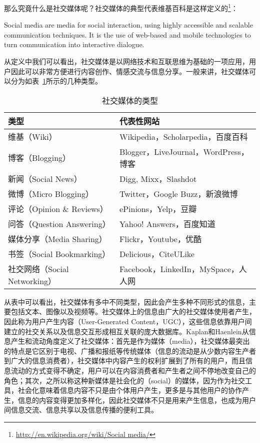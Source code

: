 那么究竟什么是社交媒体呢？社交媒体的典型代表维基百科是这样定义的\footnote{\url{http://en.wikipedia.org/wiki/Social media/}}：

\begin{definition}
Social media are media for social interaction, using highly accessible and scalable communication techniques. It is the use of web-based and mobile technologies to turn communication into interactive dialogue.
\end{definition}

从定义中我们可以看出，社交媒体是以网络技术和互联思维为基础的一项应用，用户因此可以非常方便进行内容创作、情感交流与信息分享。一般来讲，社交媒体可以分为如表~\ref{tab1-2}所示的几种类型。

\begin{table}[htp]
\centering
\caption{社交媒体的类型}
\label{tab1-2}
 \begin{tabular}{|l|l|}
 \hline
 类型& 代表性网站\\
 \hline
 维基（Wiki） & Wikipedia，Scholarpedia，百度百科\\
 \hline
 博客（Blogging） & Blogger，LiveJournal，WordPress，博客\\
 \hline
 新闻（Social News） & Digg, Mixx，Slashdot\\
 \hline
 微博（Micro Blogging） & Twitter，Google Buzz，新浪微博\\
 \hline
 评论（Opinion \& Reviews） & ePinions，Yelp，豆瓣\\
 \hline
 问答（Question Answering） & Yahoo! Answers，百度知道\\
 \hline
 媒体分享（Media Sharing） & Flickr，Youtube，优酷\\
 \hline
 书签（Social Bookmarking） & Delicious，CiteULike\\
 \hline
 社交网络（Social Networking） & Facebook，LinkedIn，MySpace，人人网\\
 \hline
\end{tabular}
\end{table}

从表中可以看出，社交媒体有多中不同类型，因此会产生多种不同形式的信息，主要包括文本、图像以及视频等。社交媒体上的信息由广大的社交媒体使用者产生，因此称为用户产生内容（User-Generated Content，UGC），这些信息依靠用户间建立的社交关系以及信息交互形成相互关联的庞大数据库。Kaplan和Haenlein从信息产生和流动角度定义了社交媒体：首先是作为媒体（media），社交媒体最突出的特点是它区别于电视、广播和报纸等传统媒体（信息的流动是从少数内容生产者到广大的信息消费者），社交媒体中内容产生的权利扩展到了所有的用户，而且信息流动的方式变得不确定，用户可以在内容消费者和产生者之间不停地改变自己的角色；其次，之所以称这种新媒体是社会化的（social）的媒体，因为作为社交工具，社会化意味着信息内容不只是由个体用户产生，更多是与其他用户的协作产生，信息的内容变得更加多样化，因此社交媒体不只是用来产生信息，也成为用户间信息交流、信息共享以及信息传播的便利工具。

